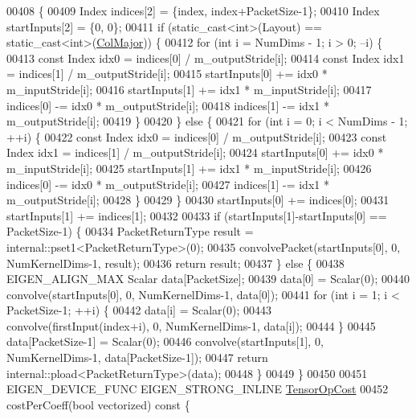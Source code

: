 \begin{DoxyCode}
00408 \textcolor{keyword}{  }\{
00409     Index indices[2] = \{index, index+PacketSize-1\};
00410     Index startInputs[2] = \{0, 0\};
00411     \textcolor{keywordflow}{if} (static\_cast<int>(Layout) == static\_cast<int>(\hyperlink{group__enums_ggaacded1a18ae58b0f554751f6cdf9eb13a0cbd4bdd0abcfc0224c5fcb5e4f6669a}{ColMajor})) \{
00412       \textcolor{keywordflow}{for} (\textcolor{keywordtype}{int} i = NumDims - 1; i > 0; --i) \{
00413         \textcolor{keyword}{const} Index idx0 = indices[0] / m\_outputStride[i];
00414         \textcolor{keyword}{const} Index idx1 = indices[1] / m\_outputStride[i];
00415         startInputs[0] += idx0 * m\_inputStride[i];
00416         startInputs[1] += idx1 * m\_inputStride[i];
00417         indices[0] -= idx0 * m\_outputStride[i];
00418         indices[1] -= idx1 * m\_outputStride[i];
00419       \}
00420     \} \textcolor{keywordflow}{else} \{
00421       \textcolor{keywordflow}{for} (\textcolor{keywordtype}{int} i = 0; i < NumDims - 1; ++i) \{
00422         \textcolor{keyword}{const} Index idx0 = indices[0] / m\_outputStride[i];
00423         \textcolor{keyword}{const} Index idx1 = indices[1] / m\_outputStride[i];
00424         startInputs[0] += idx0 * m\_inputStride[i];
00425         startInputs[1] += idx1 * m\_inputStride[i];
00426         indices[0] -= idx0 * m\_outputStride[i];
00427         indices[1] -= idx1 * m\_outputStride[i];
00428       \}
00429     \}
00430     startInputs[0] += indices[0];
00431     startInputs[1] += indices[1];
00432 
00433     \textcolor{keywordflow}{if} (startInputs[1]-startInputs[0] == PacketSize-1) \{
00434       PacketReturnType result = internal::pset1<PacketReturnType>(0);
00435       convolvePacket(startInputs[0], 0, NumKernelDims-1, result);
00436       \textcolor{keywordflow}{return} result;
00437     \} \textcolor{keywordflow}{else} \{
00438       EIGEN\_ALIGN\_MAX Scalar data[PacketSize];
00439       data[0] = Scalar(0);
00440       convolve(startInputs[0], 0, NumKernelDims-1, data[0]);
00441       \textcolor{keywordflow}{for} (\textcolor{keywordtype}{int} i = 1; i < PacketSize-1; ++i) \{
00442         data[i] = Scalar(0);
00443         convolve(firstInput(index+i), 0, NumKernelDims-1, data[i]);
00444       \}
00445       data[PacketSize-1] = Scalar(0);
00446       convolve(startInputs[1], 0, NumKernelDims-1, data[PacketSize-1]);
00447       \textcolor{keywordflow}{return} internal::pload<PacketReturnType>(data);
00448     \}
00449   \}
00450 
00451   EIGEN\_DEVICE\_FUNC EIGEN\_STRONG\_INLINE \hyperlink{class_eigen_1_1_tensor_op_cost}{TensorOpCost}
00452   costPerCoeff(\textcolor{keywordtype}{bool} vectorized)\textcolor{keyword}{ const }\{

\end{DoxyCode}

